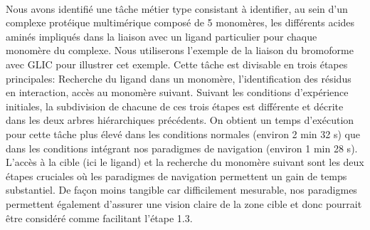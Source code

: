 \\

Nous avons identifié une tâche métier type consistant à identifier, au sein d'un complexe protéique multimérique composé de 5 monomères, les différents acides aminés impliqués dans la liaison avec un ligand particulier pour chaque monomère du complexe. Nous utiliserons l'exemple de la liaison du bromoforme avec GLIC pour illustrer cet exemple. Cette tâche est divisable en trois étapes principales: Recherche du ligand dans un monomère, l'identification des résidus en interaction, accès au monomère suivant. Suivant les conditions d'expérience initiales, la subdivision de chacune de ces trois étapes est différente et décrite dans les deux arbres hiérarchiques précédents. On obtient un temps d’exécution pour cette tâche plus élevé dans les conditions normales (environ 2 min 32 s) que dans les conditions intégrant nos paradigmes de navigation (environ 1 min 28 s). L'accès à la cible (ici le ligand) et la recherche du monomère suivant sont les deux étapes cruciales où les paradigmes de navigation permettent un gain de temps substantiel. De façon moins tangible car difficilement mesurable, nos paradigmes permettent également d'assurer une vision claire de la zone cible et donc pourrait être considéré comme facilitant l'étape 1.3.

